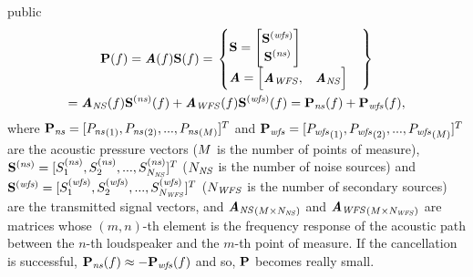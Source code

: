 \begin{shownto}{public}
\begin{multline}
	\Field[noValue][frequency][vector](f)
	= \AcPath[mat](f) \vec{\signal[nothing][frequency]}(f)
	= \left. \begin{cases}
		\vec{\signal[nothing][frequency]} = 
		\begin{bmatrix}
			\vec{\signal[wfs][frequency]} \\
			\vec{\signal[ns][frequency]}
		\end{bmatrix} \\
		\AcPath[mat] =
		\begin{bmatrix}
			\AcPath[mat][WFS], & \AcPath[mat][NS]
		\end{bmatrix}
	\end{cases} \right\} \\
	= \AcPath[mat][NS](f) \vec{\signal[ns][frequency]}(f) + \AcPath[mat][WFS](f) \vec{\signal[wfs][frequency]}(f)
	= \Field[ns][frequency][vector](f) + \Field[wfs][frequency][vector](f),
	\label{acPathModel}
\end{multline}
where $\Field[ns][frequency][vector] = [\Field[ns][frequency][scalar][1], \Field[ns][frequency][scalar][2], ..., \Field[ns][frequency][scalar][\numMeasPoints]]^T$ and $\Field[wfs][frequency][vector] = [\Field[wfs][frequency][scalar][1], \Field[wfs][frequency][scalar][2], ..., \Field[wfs][frequency][scalar][\numMeasPoints]]^T$ are the acoustic pressure vectors ($M$ is the number of points of measure), $\vec{\signal[ns][frequency]} = [\signal[ns][frequency]_1, \signal[ns][frequency]_2, ..., \signal[ns][frequency]_{\numNS}]^T$ ($N_\mathit{NS}$ is the number of noise sources) and $\vec{\signal[wfs][frequency]} = [\signal[wfs][frequency]_1, \signal[wfs][frequency]_2, ..., \signal[wfs][frequency]_{\numWFS}]^T$ ($N_\mathit{WFS}$ is the number of secondary sources) are the transmitted signal vectors, and ${\AcPath[mat][NS]}_{(\numMeasPoints \times \numNS)}$ and ${\AcPath[mat][WFS]}_{(\numMeasPoints \times \numWFS)}$ are matrices whose $(m,n)$-th element is the frequency response of the acoustic path between the $n$-th loudspeaker and the $m$-th point of measure. If the cancellation is successful, $\Field[ns][frequency][vector](f) \approx -\Field[wfs][frequency][vector](f)$ and so, $\Field[noValue][frequency][vector]$ becomes really small.
\end{shownto}

